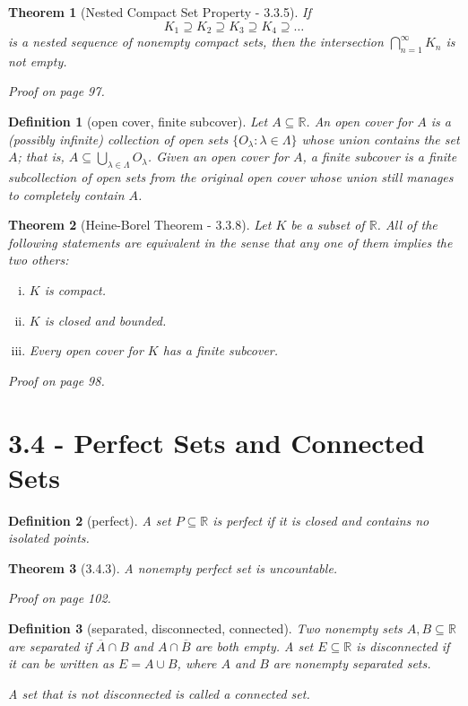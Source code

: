 \documentclass{article}
\newtheorem{definition}{Definition}
\newtheorem{theorem}{Theorem}
\begin{document}
\begin{theorem}[Nested Compact Set Property - 3.3.5]
    If \[K_1 \supseteq K_2 \supseteq K_3 \supseteq K_4 \supseteq \dots \] is a nested sequence of nonempty compact sets, then the intersection $\bigcap _{n=1}^\infty K_n$ is not empty.

    Proof on page 97.
\end{theorem}

\begin{definition}[open cover, finite subcover]
    Let $A \subseteq \mathbb{R}$. An \textit{open cover} for $A$ is a (possibly infinite) collection of open sets $\{O_\lambda : \lambda \in \Lambda \}$ whose union contains the set $A$; that is, $A \subseteq \bigcup _{\lambda \in \Lambda} O_\lambda$. Given an open cover for $A$, a \textit{finite subcover} is a finite subcollection of open sets from the original open cover whose union still manages to completely contain $A$.
\end{definition}

\begin{theorem}[Heine-Borel Theorem - 3.3.8]
    Let $K$ be a subset of $\mathbb{R}$. All of the following statements are equivalent in the sense that any one of them implies the two others:
    \begin{enumerate}[(i)]
        \item $K$ is compact.
        \item $K$ is closed and bounded.
        \item Every open cover for $K$ has a finite subcover.
    \end{enumerate}

    Proof on page 98.
\end{theorem}

\section*{3.4 - Perfect Sets and Connected Sets}
\begin{definition}[perfect]
    A set $P \subseteq \mathbb{R}$ is \textit{perfect} if it is closed and contains no isolated points.
\end{definition}

\begin{theorem}[3.4.3]
    A nonempty perfect set is uncountable.

    Proof on page 102.
\end{theorem}

\begin{definition}[separated, disconnected, connected]
    Two nonempty sets $A,B \subseteq \mathbb{R}$ are \textit{separated} if $\overline{A}\cap B$ and $A \cap \overline{B}$ are both empty. A set $E \subseteq \mathbb{R}$ is \textit{disconnected} if it can be written as $E = A \cup B$, where $A$ and $B$ are nonempty separated sets.

    A set that is not disconnected is called a \textit{connected} set.
\end{definition}
\end{document}
